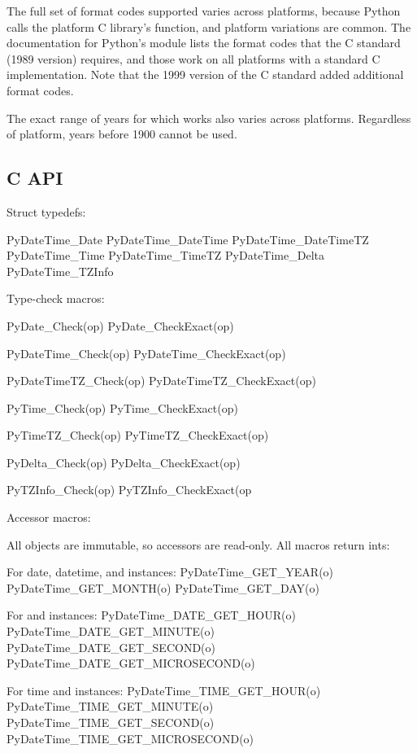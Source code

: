 The full set of format codes supported varies across platforms,
because Python calls the platform C library's 
function, and platform variations are common.  The documentation for
Python's  module lists the format codes that the C
standard (1989 version) requires, and those work on all platforms
with a standard C implementation.  Note that the 1999 version of the
C standard added additional format codes.

The exact range of years for which  works also
varies across platforms.  Regardless of platform, years before 1900
cannot be used.


\subsection{C API}

Struct typedefs:

    PyDateTime_Date
    PyDateTime_DateTime
    PyDateTime_DateTimeTZ
    PyDateTime_Time
    PyDateTime_TimeTZ
    PyDateTime_Delta
    PyDateTime_TZInfo

Type-check macros:

    PyDate_Check(op)
    PyDate_CheckExact(op)

    PyDateTime_Check(op)
    PyDateTime_CheckExact(op)

    PyDateTimeTZ_Check(op)
    PyDateTimeTZ_CheckExact(op)

    PyTime_Check(op)
    PyTime_CheckExact(op)

    PyTimeTZ_Check(op)
    PyTimeTZ_CheckExact(op)

    PyDelta_Check(op)
    PyDelta_CheckExact(op)

    PyTZInfo_Check(op)
    PyTZInfo_CheckExact(op

Accessor macros:

All objects are immutable, so accessors are read-only.  All macros
return ints:

    For date, datetime, and  instances:
        PyDateTime_GET_YEAR(o)
        PyDateTime_GET_MONTH(o)
        PyDateTime_GET_DAY(o)

    For  and  instances:
        PyDateTime_DATE_GET_HOUR(o)
        PyDateTime_DATE_GET_MINUTE(o)
        PyDateTime_DATE_GET_SECOND(o)
        PyDateTime_DATE_GET_MICROSECOND(o)

    For time and  instances:
        PyDateTime_TIME_GET_HOUR(o)
        PyDateTime_TIME_GET_MINUTE(o)
        PyDateTime_TIME_GET_SECOND(o)
        PyDateTime_TIME_GET_MICROSECOND(o)
